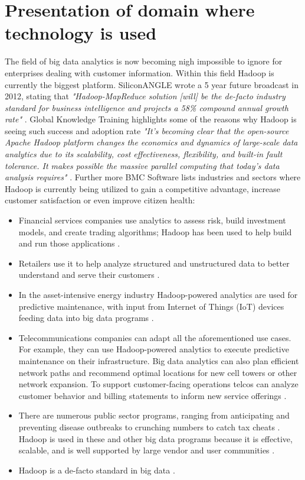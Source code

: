 \documentclass[a4paper,english]{report}
\begin{document}
	\section{Presentation of domain where technology is used}
		The field of big data analytics is now becoming nigh impossible to ignore for enterprises dealing with customer information. Within this field Hadoop is currently the biggest platform. SiliconANGLE wrote a 5 year future broadcast in 2012, stating that \textit{"Hadoop-MapReduce solution [will] be the de-facto industry standard for business intelligence and projects a 58\% compound annual growth rate"} \cite{siliconA}.
		Global Knowledge Training highlights some of the reasons why Hadoop is seeing such success and adoption rate
		\textit{"It's becoming clear that the open-source Apache Hadoop platform changes the economics and dynamics of large-scale data analytics due to its scalability, cost effectiveness, flexibility, and built-in fault tolerance. It makes possible the massive parallel computing that today's data analysis requires"} \cite{globalknowledge}.
		Further more BMC Software lists industries and sectors where Hadoop is currently being utilized to gain a competitive advantage, increase customer satisfaction or even improve citizen health:
		\begin{itemize}
			\item Financial services companies use analytics to assess risk, build investment models, and create trading algorithms; Hadoop has been used to help build and run those applications \cite{bmc}.
			\item Retailers use it to help analyze structured and unstructured data to better understand and serve their customers \cite{bmc}.
			\item In the asset-intensive energy industry Hadoop-powered analytics are used for predictive maintenance, with input from Internet of Things (IoT) devices feeding data into big data programs \cite{bmc}.
			\item Telecommunications companies can adapt all the aforementioned use cases. For example, they can use Hadoop-powered analytics to execute predictive maintenance on their infrastructure. Big data analytics can also plan efficient network paths and recommend optimal locations for new cell towers or other network expansion. To support customer-facing operations telcos can analyze customer behavior and billing statements to inform new service offerings \cite{bmc}.
			\item There are numerous public sector programs, ranging from anticipating and preventing disease outbreaks to crunching numbers to catch tax cheats \cite{bmc}.
			Hadoop is used in these and other big data programs because it is effective, scalable, and is well supported by large vendor and user communities \cite{bmc}.
			\item Hadoop is a de-facto standard in big data \cite{bmc}.
		\end{itemize}
	
\end{document}
